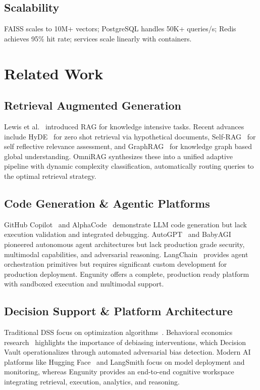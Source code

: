 \documentclass[conference]{IEEEtran}
\begin{document}
\subsection{Scalability}
FAISS scales to 10M+ vectors; PostgreSQL handles 50K+ queries/s; Redis achieves 95\% hit rate; services scale linearly with containers.


\section{Related Work}

\subsection{Retrieval Augmented Generation}
Lewis et al.~\cite{lewis2020retrieval} introduced RAG for knowledge intensive tasks. Recent advances include HyDE~\cite{gao2022precise} for zero shot retrieval via hypothetical documents, Self-RAG~\cite{asai2023self} for self reflective relevance assessment, and GraphRAG~\cite{edge2024graphrag} for knowledge graph based global understanding. OmniRAG synthesizes these into a unified adaptive pipeline with dynamic complexity classification, automatically routing queries to the optimal retrieval strategy.

\subsection{Code Generation \& Agentic Platforms}
GitHub Copilot~\cite{chen2021evaluating} and AlphaCode~\cite{li2022competition} demonstrate LLM code generation but lack execution validation and integrated debugging. AutoGPT~\cite{autogpt2023} and BabyAGI~\cite{babyagi2023} pioneered autonomous agent architectures but lack production grade security, multimodal capabilities, and adversarial reasoning. LangChain~\cite{chase2022langchain} provides agent orchestration primitives but requires significant custom development for production deployment. Engunity offers a complete, production ready platform with sandboxed execution and multimodal support.

\subsection{Decision Support \& Platform Architecture}
Traditional DSS focus on optimization algorithms~\cite{power2002decision}. Behavioral economics research~\cite{kahneman2011thinking} highlights the importance of debiasing interventions, which Decision Vault operationalizes through automated adversarial bias detection. Modern AI platforms like Hugging Face~\cite{wolf2020transformers} and LangSmith focus on model deployment and monitoring, whereas Engunity provides an end-to-end cognitive workspace integrating retrieval, execution, analytics, and reasoning.
\end{document}
